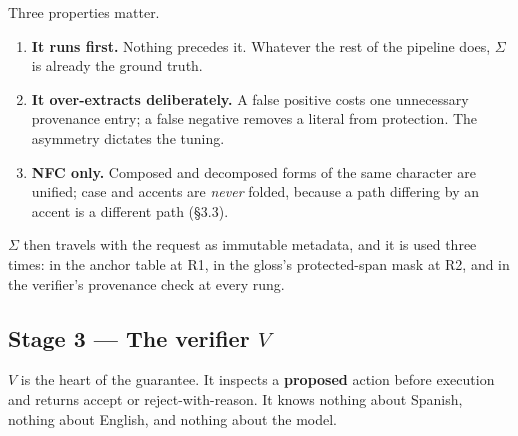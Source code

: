 Three properties matter.

\begin{enumerate}
  \item \textbf{It runs first.} Nothing precedes it. Whatever the rest of the
        pipeline does, $\Sigma$ is already the ground truth.
  \item \textbf{It over-extracts deliberately.} A false positive costs one
        unnecessary provenance entry; a false negative removes a literal from
        protection. The asymmetry dictates the tuning.
  \item \textbf{NFC only.} Composed and decomposed forms of the same character
        are unified; case and accents are \emph{never} folded, because a path
        differing by an accent is a different path (\S3.3).
\end{enumerate}

$\Sigma$ then travels with the request as immutable metadata, and it is used
three times: in the anchor table at R1, in the gloss's protected-span mask at
R2, and in the verifier's provenance check at every rung.

\subsection{Stage 3 --- The verifier \texorpdfstring{$V$}{V}}
\label{sec:nepantla-verifier}

$V$ is the heart of the guarantee. It inspects a \textbf{proposed} action before
execution and returns accept or reject-with-reason. It knows nothing about
Spanish, nothing about English, and nothing about the model.


